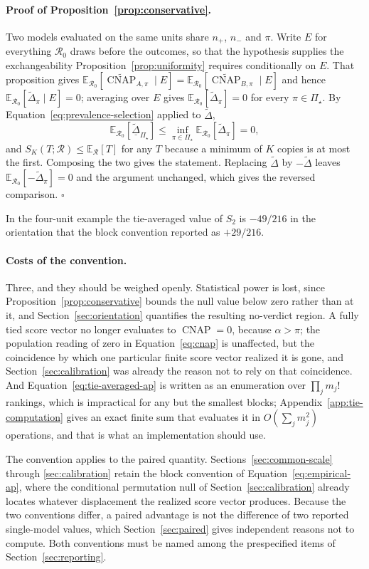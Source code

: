 \documentclass[11pt]{article}
\newcommand{\CNAP}{\operatorname{CNAP}}
\newcommand{\Regime}{\mathcal{R}}
\newcommand{\PSet}{\Pi_\star}
\newcommand{\E}{\mathbb{E}}
\newcommand{\CNAPta}{\widetilde{\CNAP}}
\newcommand{\Dta}{\widetilde{\Delta}}
\newcommand{\RobDta}{\underline{\widetilde{\Delta}}_{\PSet}}
\theoremstyle{remark}
\begin{document}
\paragraph{Proof of Proposition~\ref{prop:conservative}.}
Two models evaluated on the same units share $n_+$, $n_-$ and $\pi$. Write $E$ for everything $\Regime_0$ draws before the outcomes, so that the hypothesis supplies the exchangeability Proposition~\ref{prop:uniformity} requires conditionally on $E$. That proposition gives $\E_{\Regime_0}[\CNAPta_{A,\pi}\mid E]=\E_{\Regime_0}[\CNAPta_{B,\pi}\mid E]$ and hence $\E_{\Regime_0}[\Dta_\pi\mid E]=0$; averaging over $E$ gives $\E_{\Regime_0}[\Dta_\pi]=0$ for every $\pi\in\PSet$. By Equation~\eqref{eq:prevalence-selection} applied to $\Dta$,
\[
\E_{\Regime_0}[\RobDta]
\leq
\inf_{\pi\in\PSet}\E_{\Regime_0}[\Dta_\pi]
=0 ,
\]
and $S_K(T;\Regime)\leq\E_{\Regime}[T]$ for any $T$ because a minimum of $K$ copies is at most the first. Composing the two gives the statement. Replacing $\Dta$ by $-\Dta$ leaves $\E_{\Regime_0}[-\Dta_\pi]=0$ and the argument unchanged, which gives the reversed comparison. $\square$

In the four-unit example the tie-averaged value of $S_2$ is $-49/216$ in the orientation that the block convention reported as $+29/216$.

\paragraph{Costs of the convention.}
Three, and they should be weighed openly. Statistical power is lost, since Proposition~\ref{prop:conservative} bounds the null value below zero rather than at it, and Section~\ref{sec:orientation} quantifies the resulting no-verdict region. A fully tied score vector no longer evaluates to $\CNAP=0$, because $\alpha>\pi$; the population reading of zero in Equation~\eqref{eq:cnap} is unaffected, but the coincidence by which one particular finite score vector realized it is gone, and Section~\ref{sec:calibration} was already the reason not to rely on that coincidence. And Equation~\eqref{eq:tie-averaged-ap} is written as an enumeration over $\prod_j m_j!$ rankings, which is impractical for any but the smallest blocks; Appendix~\ref{app:tie-computation} gives an exact finite sum that evaluates it in $O(\sum_j m_j^2)$ operations, and that is what an implementation should use.

The convention applies to the paired quantity. Sections~\ref{sec:common-scale} through \ref{sec:calibration} retain the block convention of Equation~\eqref{eq:empirical-ap}, where the conditional permutation null of Section~\ref{sec:calibration} already locates whatever displacement the realized score vector produces. Because the two conventions differ, a paired advantage is not the difference of two reported single-model values, which Section~\ref{sec:paired} gives independent reasons not to compute. Both conventions must be named among the prespecified items of Section~\ref{sec:reporting}.
\end{document}
